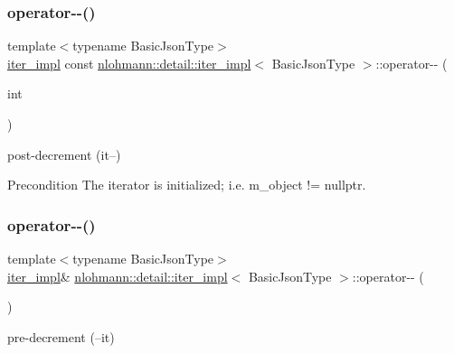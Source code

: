 \subsubsection{\texorpdfstring{operator-\/-\/()}{operator--()}\hspace{0.1cm}{\footnotesize\ttfamily [1/2]}}
{\footnotesize\ttfamily template$<$typename Basic\+Json\+Type$>$ \\
\mbox{\hyperlink{classnlohmann_1_1detail_1_1iter__impl}{iter\+\_\+impl}} const \mbox{\hyperlink{classnlohmann_1_1detail_1_1iter__impl}{nlohmann\+::detail\+::iter\+\_\+impl}}$<$ Basic\+Json\+Type $>$\+::operator-\/-\/ (\begin{DoxyParamCaption}\item[{int}]{ }\end{DoxyParamCaption})\hspace{0.3cm}{\ttfamily [inline]}}



post-\/decrement (it--) 

\begin{DoxyPrecond}{Precondition}
The iterator is initialized; i.\+e. {\ttfamily m\+\_\+object != nullptr}. 
\end{DoxyPrecond}
\mbox{\label{classnlohmann_1_1detail_1_1iter__impl_a84e689fb581d651d130039f7cb81494a}} 
\subsubsection{\texorpdfstring{operator-\/-\/()}{operator--()}\hspace{0.1cm}{\footnotesize\ttfamily [2/2]}}
{\footnotesize\ttfamily template$<$typename Basic\+Json\+Type$>$ \\
\mbox{\hyperlink{classnlohmann_1_1detail_1_1iter__impl}{iter\+\_\+impl}}\& \mbox{\hyperlink{classnlohmann_1_1detail_1_1iter__impl}{nlohmann\+::detail\+::iter\+\_\+impl}}$<$ Basic\+Json\+Type $>$\+::operator-\/-\/ (\begin{DoxyParamCaption}{ }\end{DoxyParamCaption})\hspace{0.3cm}{\ttfamily [inline]}}



pre-\/decrement (--it) 

